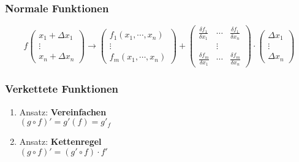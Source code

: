 \subsubsection{Normale Funktionen}
\begin{displaymath}
	f
	\begin{pmatrix}
		x_1 + \Delta x_1 \\
		\vdots \\
		x_n + \Delta x_n
	\end{pmatrix}
	\rightarrow
	\begin{pmatrix}
		f_1(x_1,\cdots , x_n) \\
		\vdots \\
		f_m(x_1,\cdots , x_n)
	\end{pmatrix}
	+
	\begin{pmatrix}
		\frac{\delta f_1}{\delta x_1} & \cdots & \frac{\delta f_1}{\delta x_n} \\
		& \vdots & \\
		\frac{\delta f_m}{\delta x_1} & \cdots & \frac{\delta f_m}{\delta x_n}
	\end{pmatrix}
	\cdot
	\begin{pmatrix}
		\Delta x_1 \\
		\vdots \\
		\Delta x_n
	\end{pmatrix}
\end{displaymath}

\subsubsection{Verkettete Funktionen}
\begin{enumerate}
    \item Ansatz: \textbf{Vereinfachen} \\
    $(g \circ f)' = g'(f) = g'_f$

    \item Ansatz: \textbf{Kettenregel} \\
    $(g \circ f)' = (g' \circ f) \cdot f'$
\end{enumerate}
